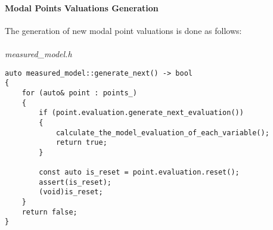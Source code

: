 \documentclass{article}
\begin{document}
	\paragraph{Modal Points Valuations Generation}
	The generation of new modal point valuations is done as follows:
	\\
	\\
\noindent
\textit{measured\_model.h}
\begin{lstlisting}
auto measured_model::generate_next() -> bool
{
    for (auto& point : points_)
    {
        if (point.evaluation.generate_next_evaluation())
        {
            calculate_the_model_evaluation_of_each_variable();
            return true;
        }

        const auto is_reset = point.evaluation.reset();
        assert(is_reset);
        (void)is_reset;
    }
    return false;
}
\end{lstlisting}
\end{document}
